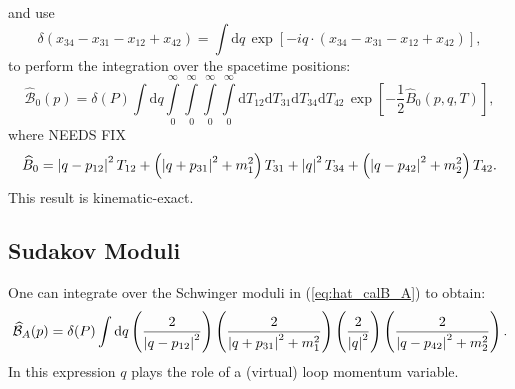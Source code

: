 and use
\begin{equation}
	\delta(x_{34} - x_{31} - x_{12} + x_{42}) = \int \mathrm{d}q \, \exp{\left[-i q \cdot (x_{34} - x_{31} - x_{12} + x_{42}) \right]},
\end{equation}
to perform the integration over the spacetime positions:
\begin{equation}
	\widehat{\mathcal{B}}_{0}(p) = \delta(P) \int \mathrm{d}q \int\limits_{0}^{\infty} \int\limits_{0}^{\infty} \int\limits_{0}^{\infty} \int\limits_{0}^{\infty} \mathrm{d}T_{12} \mathrm{d}T_{31} \mathrm{d}T_{34} \mathrm{d}T_{42} \, \exp{\left[- \frac{1}{2} \widehat{B}_{0}(p, q, T) \right]},
	\label{eq:hat_calB_A}
\end{equation}
where NEEDS FIX
\begin{equation}
	\widehat{B}_{0} = \left\lvert q - p_{12} \right\rvert^{2} T_{12} + \left(\left\lvert q + p_{31} \right\rvert^{2} + m_{1}^{2} \right) T_{31} + \left\lvert q \right\rvert^{2} T_{34} + \left(\left\lvert q - p_{42} \right\rvert^{2} + m_{2}^{2} \right) T_{42}.
\end{equation}
This result is kinematic-exact.
\subsection{Sudakov Moduli}
One can integrate over the Schwinger moduli in (\ref{eq:hat_calB_A}) to obtain:
\begin{equation}
	\widehat{\mathcal{B}}_{A}(p) = \delta(P) \int \mathrm{d}q \left( \frac{2}{\left\lvert q - p_{12} \right\rvert^{2}} \right) \left( \frac{2}{\left\lvert q + p_{31} \right\rvert^{2} + m_{1}^{2}} \right) \left( \frac{2}{\left\lvert q \right\rvert^{2}} \right) \left( \frac{2}{\left\lvert q - p_{42} \right\rvert^{2} + m_{2}^{2}} \right).
	\label{eq:sudakov_B_A}
\end{equation}
In this expression $q$ plays the role of a (virtual) loop momentum variable.

